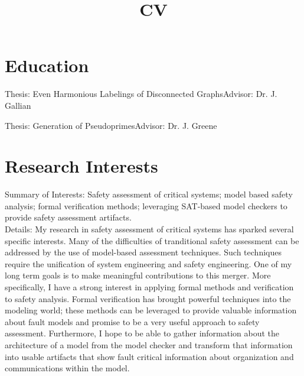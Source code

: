 \documentclass[11pt,a4paper,sans]{moderncv}        %
\title{CV}                               %
\begin{document}
\makecvtitle

\section{Education}


{Thesis: Even Harmonious Labelings of Disconnected Graphs}{Advisor: Dr. J. Gallian}


{Thesis: Generation of Pseudoprimes}{Advisor: Dr. J. Greene}







\section{Research Interests}
Summary of Interests: Safety assessment of critical systems; model based safety analysis; formal verification methods;  leveraging SAT-based model checkers to provide safety assessment artifacts.\\
					
Details: My research in safety assessment of critical systems has sparked several specific interests. Many of the difficulties of tranditional safety assessment can be addressed by the use of model-based assessment techniques. Such techniques require the unification of system engineering and safety engineering. One of my long term goals is to make meaningful contributions to this merger. More specifically, I have a strong interest in applying formal methods and verification to safety analysis. Formal verification has brought powerful techniques into the modeling world; these methods can be leveraged to provide valuable information about  fault models and promise to be a very useful approach to safety assessment.%
Furthermore, I hope to be able to gather information about the architecture of a model from the model checker and transform that information into usable artifacts that show fault critical information about organization and communications within the model.
\end{document}
